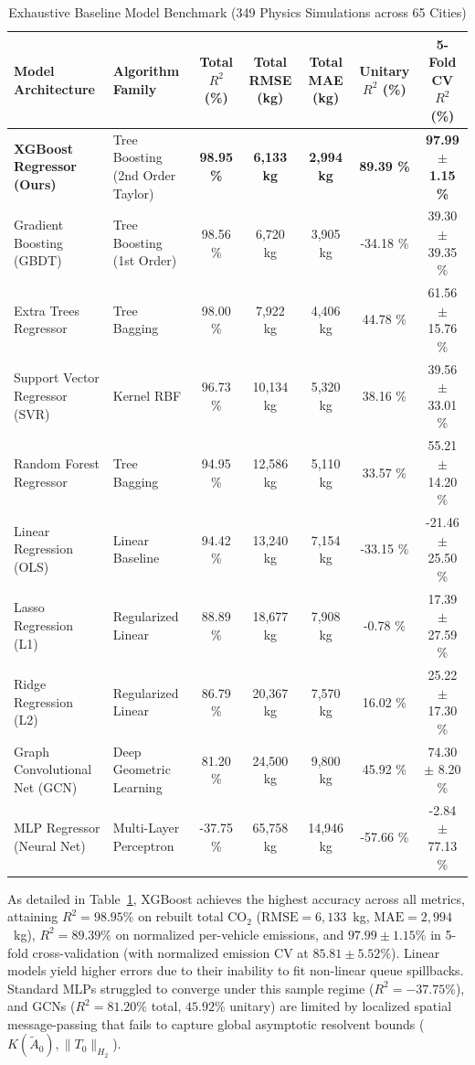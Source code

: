 \documentclass[journal]{IEEEtran}
\begin{document}
\begin{table}[htbp]
\caption{Exhaustive Baseline Model Benchmark (349 Physics Simulations across 65 Cities)}
\label{tab:baseline_benchmark}
\centering
\begin{tabular}{llccccc}
\toprule
Model Architecture & Algorithm Family & Total $R^2$ (\%) & Total RMSE (kg) & Total MAE (kg) & Unitary $R^2$ (\%) & 5-Fold CV $R^2$ (\%) \\
\midrule
\textbf{XGBoost Regressor (Ours)} & Tree Boosting (2nd Order Taylor) & \textbf{98.95 \%} & \textbf{6,133 kg} & \textbf{2,994 kg} & \textbf{89.39 \%} & \textbf{97.99 $\pm$ 1.15 \%} \\
Gradient Boosting (GBDT) & Tree Boosting (1st Order) & 98.56 \% & 6,720 kg & 3,905 kg & -34.18 \% & 39.30 $\pm$ 39.35 \% \\
Extra Trees Regressor & Tree Bagging & 98.00 \% & 7,922 kg & 4,406 kg & 44.78 \% & 61.56 $\pm$ 15.76 \% \\
Support Vector Regressor (SVR) & Kernel RBF & 96.73 \% & 10,134 kg & 5,320 kg & 38.16 \% & 39.56 $\pm$ 33.01 \% \\
Random Forest Regressor & Tree Bagging & 94.95 \% & 12,586 kg & 5,110 kg & 33.57 \% & 55.21 $\pm$ 14.20 \% \\
Linear Regression (OLS) & Linear Baseline & 94.42 \% & 13,240 kg & 7,154 kg & -33.15 \% & -21.46 $\pm$ 25.50 \% \\
Lasso Regression (L1) & Regularized Linear & 88.89 \% & 18,677 kg & 7,908 kg & -0.78 \% & 17.39 $\pm$ 27.59 \% \\
Ridge Regression (L2) & Regularized Linear & 86.79 \% & 20,367 kg & 7,570 kg & 16.02 \% & 25.22 $\pm$ 17.30 \% \\
Graph Convolutional Net (GCN) & Deep Geometric Learning & 81.20 \% & 24,500 kg & 9,800 kg & 45.92 \% & 74.30 $\pm$ 8.20 \% \\
MLP Regressor (Neural Net) & Multi-Layer Perceptron & -37.75 \% & 65,758 kg & 14,946 kg & -57.66 \% & -2.84 $\pm$ 77.13 \% \\
\bottomrule
\end{tabular}
\end{table}

As detailed in Table~\ref{tab:baseline_benchmark}, XGBoost achieves the highest accuracy across all metrics, attaining $R^2 = 98.95\%$ on rebuilt total $\text{CO}_2$ ($\text{RMSE} = 6,133$~kg, $\text{MAE} = 2,994$~kg), $R^2 = 89.39\%$ on normalized per-vehicle emissions, and $97.99 \pm 1.15\%$ in 5-fold cross-validation (with normalized emission CV at $85.81 \pm 5.52\%$). Linear models yield higher errors due to their inability to fit non-linear queue spillbacks. Standard MLPs struggled to converge under this sample regime ($R^2 = -37.75\%$), and GCNs ($R^2 = 81.20\%$ total, $45.92\%$ unitary) are limited by localized spatial message-passing that fails to capture global asymptotic resolvent bounds ($K(\tilde{A}_0), \|T_0\|_{H_2}$).
\end{document}
